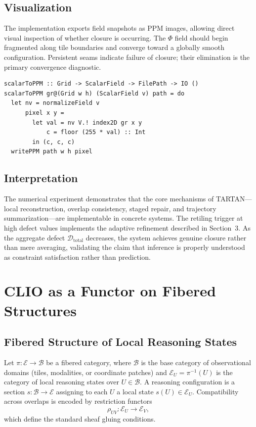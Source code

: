 \documentclass[12pt, oneside]{article}
\begin{document}
\subsection{Visualization}

The implementation exports field snapshots as PPM images, allowing direct visual inspection of whether closure is occurring. The $\Phi$ field should begin fragmented along tile boundaries and converge toward a globally smooth configuration. Persistent seams indicate failure of closure; their elimination is the primary convergence diagnostic.

\begin{lstlisting}
scalarToPPM :: Grid -> ScalarField -> FilePath -> IO ()
scalarToPPM gr@(Grid w h) (ScalarField v) path = do
  let nv = normalizeField v
      pixel x y =
        let val = nv V.! index2D gr x y
            c = floor (255 * val) :: Int
        in (c, c, c)
  writePPM path w h pixel
\end{lstlisting}

\subsection{Interpretation}

The numerical experiment demonstrates that the core mechanisms of TARTAN---local reconstruction, overlap consistency, staged repair, and trajectory summarization---are implementable in concrete systems. The retiling trigger at high defect values implements the adaptive refinement described in Section~3. As the aggregate defect $\mathcal{D}_{\text{total}}$ decreases, the system achieves genuine closure rather than mere averaging, validating the claim that inference is properly understood as constraint satisfaction rather than prediction.

\section{CLIO as a Functor on Fibered Structures}

\subsection{Fibered Structure of Local Reasoning States}

Let $\pi : \mathcal{E} \to \mathcal{B}$ be a fibered category, where $\mathcal{B}$ is the base category of observational domains (tiles, modalities, or coordinate patches) and $\mathcal{E}_U = \pi^{-1}(U)$ is the category of local reasoning states over $U \in \mathcal{B}$. A reasoning configuration is a section $s : \mathcal{B} \to \mathcal{E}$ assigning to each $U$ a local state $s(U) \in \mathcal{E}_U$. Compatibility across overlaps is encoded by restriction functors
\[
\rho_{UV} : \mathcal{E}_U \to \mathcal{E}_V,
\]
which define the standard sheaf gluing conditions.
\end{document}
